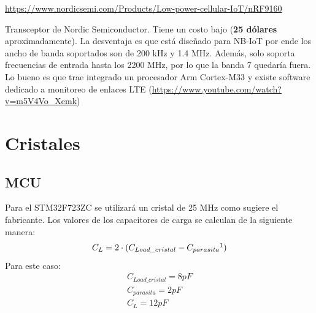 \documentclass[a4paper,12pt]{report} %
\begin{document}
\url{https://www.nordicsemi.com/Products/Low-power-cellular-IoT/nRF9160}

Transceptor de Nordic Semiconductor. Tiene un costo bajo (\textbf{25 dólares} aproximadamente). La desventaja es que está diseñado para NB-IoT por ende los ancho de banda soportados son de 200 kHz y 1.4 MHz. Además, solo soporta frecuencias de entrada hasta los 2200 MHz, por lo que la banda 7 quedaría fuera. Lo bueno es que trae integrado un procesador Arm Cortex-M33 y existe software dedicado a monitoreo de enlaces LTE (\url{https://www.youtube.com/watch?v=m5V4Vo_Xemk})

\section{Cristales}
\subsection{MCU}
Para el STM32F723ZC se utilizará un cristal de 25 MHz como sugiere el fabricante. Los valores de los capacitores de carga se calculan de la siguiente manera:
\begin{equation}
	C_L = 2 \cdot (C_{Load\_cristal} - C_{parasita}\footnotemark)
\end{equation}
Para este caso:
\begin{align}
	C_{Load\_cristal} = 8 pF \\
	C_{parasita} = 2 pF \\
	C_L = 12 pF
\end{align}
\end{document}
